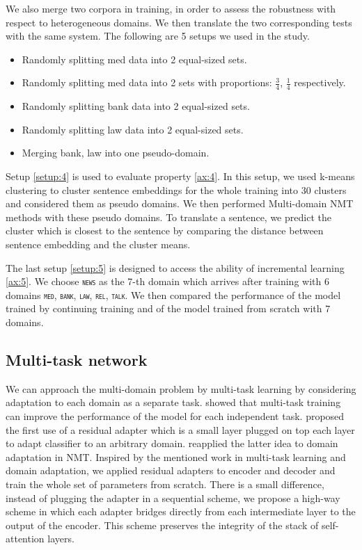 \documentclass[12pt,a4paper,twoside]{report}
\theoremstyle{definition}
\newcommand{\domain}[1]{\texttt{\textsc{#1}}}
\begin{document}
We also merge two corpora in training, in order to assess the robustness with respect to heterogeneous domains. We then translate the two corresponding tests with the same system. The following are 5 setups we used in the study.
\begin{itemize}
	\item Randomly splitting med data into 2 equal-sized sets.
 	\item Randomly splitting med data into 2 sets with proportions: $\frac{3}{4}$, $\frac{1}{4}$ respectively.
	\item Randomly splitting bank data into 2 equal-sized sets.
	\item Randomly splitting law data into 2 equal-sized sets.
	\item Merging bank, law into one pseudo-domain.
\end{itemize}

Setup \ref{setup:4} is used to evaluate property \ref{ax:4}. In this setup, we used k-means clustering to cluster sentence embeddings for the whole training into 30 clusters and considered them as pseudo domains. We then performed Multi-domain NMT methods with these pseudo domains. To translate a sentence, we predict the cluster which is closest to the sentence by comparing the distance between sentence embedding and the cluster means. 

The last setup \ref{setup:5} is designed to access the ability of incremental learning \ref{ax:5}. We choose \domain{news} as the 7-th domain which arrives after training with 6 domains \domain{med}, \domain{bank}, \domain{law}, \domain{rel}, \domain{talk}. We then compared the performance of the model trained by continuing training and of the model trained from scratch with 7 domains.

\subsection*{Multi-task network}
We can approach the multi-domain problem by multi-task learning by considering adaptation to each domain as a separate task. \cite{Caruana97multitask} showed that multi-task training can improve the performance of the model for each independent task. \cite{rebuffi18efficient} proposed the first use of a residual adapter which is a small layer plugged on top each layer to adapt classifier to an arbitrary domain. \cite{bapna19simple} reapplied the latter idea to domain adaptation in NMT. Inspired by the mentioned work in multi-task learning and domain adaptation, we applied residual adapters to encoder and decoder and train the whole set of parameters from scratch. There is a small difference, instead of plugging the adapter in a sequential scheme, we propose a high-way scheme in which each adapter bridges directly from each intermediate layer to the output of the encoder. This scheme preserves the integrity of the stack of self-attention layers.
\end{document}

